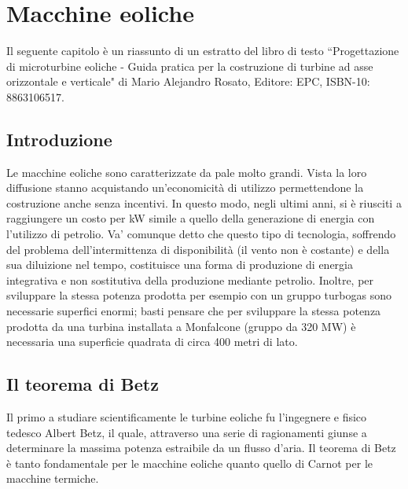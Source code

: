 \chapter{Macchine eoliche}
Il seguente capitolo è un riassunto di un estratto del libro di testo ``Progettazione di microturbine eoliche - Guida pratica per la costruzione di turbine ad asse orizzontale e verticale" di Mario Alejandro Rosato, Editore: EPC, ISBN-10: 8863106517.
\section{Introduzione}
Le macchine eoliche sono caratterizzate da pale molto grandi. Vista la loro diffusione stanno acquistando un'economicità di utilizzo permettendone la costruzione anche senza incentivi. In questo modo, negli ultimi anni, si è riusciti a raggiungere un costo per kW simile a quello della generazione di energia con l'utilizzo di petrolio. Va' comunque detto che questo tipo di tecnologia, soffrendo del problema dell'intermittenza di disponibilità (il vento non è costante) e della sua diluizione nel tempo, costituisce una forma di produzione di energia integrativa e non sostitutiva della produzione mediante petrolio. Inoltre, per sviluppare la stessa potenza prodotta per esempio con un gruppo turbogas sono necessarie superfici enormi; basti pensare che per sviluppare la stessa potenza prodotta da una turbina installata a Monfalcone (gruppo da 320 MW) è necessaria una superficie quadrata di circa 400 metri di lato.
\section{Il teorema di Betz}
Il primo a studiare scientificamente le turbine eoliche fu l'ingegnere e fisico tedesco Albert Betz, il quale, attraverso una serie di ragionamenti giunse a determinare la massima potenza estraibile da un flusso d'aria. Il teorema di Betz è tanto fondamentale per le macchine eoliche quanto quello di Carnot per le macchine termiche. 

